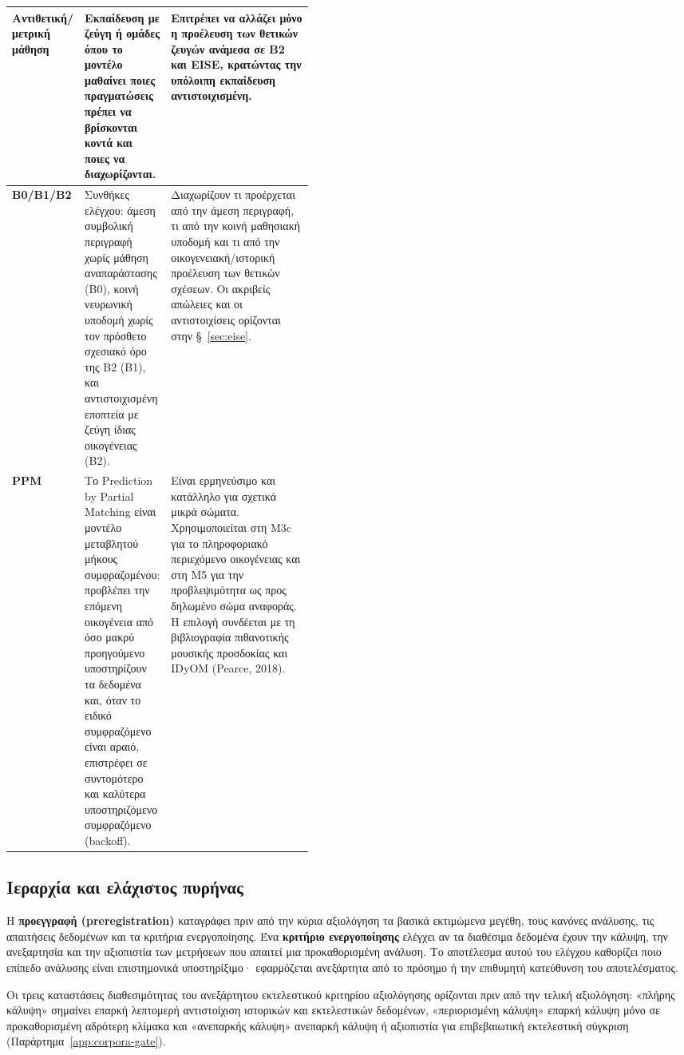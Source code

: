 \documentclass[11pt,a4paper]{article}
\begin{document}
{\begin{xltabular}{\linewidth}{@{}>{\RaggedRight\arraybackslash}p{0.19\linewidth}>{\RaggedRight\arraybackslash}p{0.25\linewidth}Y@{}}
\midrule
\textbf{Αντιθετική/μετρική μάθηση} & Εκπαίδευση με ζεύγη ή ομάδες όπου το μοντέλο μαθαίνει ποιες πραγματώσεις πρέπει να βρίσκονται κοντά και ποιες να διαχωρίζονται. & Επιτρέπει να αλλάζει μόνο η προέλευση των θετικών ζευγών ανάμεσα σε B2 και EISE, κρατώντας την υπόλοιπη εκπαίδευση αντιστοιχισμένη.\tabularnewline
\midrule
\textbf{B0/B1/B2} & Συνθήκες ελέγχου: άμεση συμβολική περιγραφή χωρίς μάθηση αναπαράστασης (B0), κοινή νευρωνική υποδομή χωρίς τον πρόσθετο σχεσιακό όρο της B2 (B1), και αντιστοιχισμένη εποπτεία με ζεύγη ίδιας οικογένειας (B2). & Διαχωρίζουν τι προέρχεται από την άμεση περιγραφή, τι από την κοινή μαθησιακή υποδομή και τι από την οικογενειακή/ιστορική προέλευση των θετικών σχέσεων. Οι ακριβείς απώλειες και οι αντιστοιχίσεις ορίζονται στην §~\ref{sec:eise}.\tabularnewline
\midrule
\textbf{PPM} & Το Prediction by Partial Matching είναι μοντέλο μεταβλητού μήκους συμφραζομένου: προβλέπει την επόμενη οικογένεια από όσο μακρύ προηγούμενο υποστηρίζουν τα δεδομένα και, όταν το ειδικό συμφραζόμενο είναι αραιό, επιστρέφει σε συντομότερο και καλύτερα υποστηριζόμενο συμφραζόμενο (backoff). & Είναι ερμηνεύσιμο και κατάλληλο για σχετικά μικρά σώματα. Χρησιμοποιείται στη M3c για το πληροφοριακό περιεχόμενο οικογένειας και στη M5 για την προβλεψιμότητα ως προς δηλωμένο σώμα αναφοράς. Η επιλογή συνδέεται με τη βιβλιογραφία πιθανοτικής μουσικής προσδοκίας και IDyOM (Pearce, 2018).\tabularnewline
\end{xltabular}
}\par

\subsection{Ιεραρχία και ελάχιστος πυρήνας}\label{sec:core-hierarchy}

Η \textbf{προεγγραφή (preregistration)} καταγράφει πριν από την κύρια αξιολόγηση τα βασικά εκτιμώμενα μεγέθη, τους κανόνες ανάλυσης, τις απαιτήσεις δεδομένων και τα κριτήρια ενεργοποίησης. Ένα \textbf{κριτήριο ενεργοποίησης} ελέγχει αν τα διαθέσιμα δεδομένα έχουν την κάλυψη, την ανεξαρτησία και την αξιοπιστία των μετρήσεων που απαιτεί μια προκαθορισμένη ανάλυση. Το αποτέλεσμα αυτού του ελέγχου καθορίζει ποιο επίπεδο ανάλυσης είναι επιστημονικά υποστηρίξιμο· εφαρμόζεται ανεξάρτητα από το πρόσημο ή την επιθυμητή κατεύθυνση του αποτελέσματος.

Οι τρεις καταστάσεις διαθεσιμότητας του ανεξάρτητου εκτελεστικού κριτηρίου αξιολόγησης ορίζονται πριν από την τελική αξιολόγηση: «πλήρης κάλυψη» σημαίνει επαρκή λεπτομερή αντιστοίχιση ιστορικών και εκτελεστικών δεδομένων, «περιορισμένη κάλυψη» επαρκή κάλυψη μόνο σε προκαθορισμένη αδρότερη κλίμακα και «ανεπαρκής κάλυψη» ανεπαρκή κάλυψη ή αξιοπιστία για επιβεβαιωτική εκτελεστική σύγκριση (Παράρτημα~\ref{app:corpora-gate}).
\end{document}
